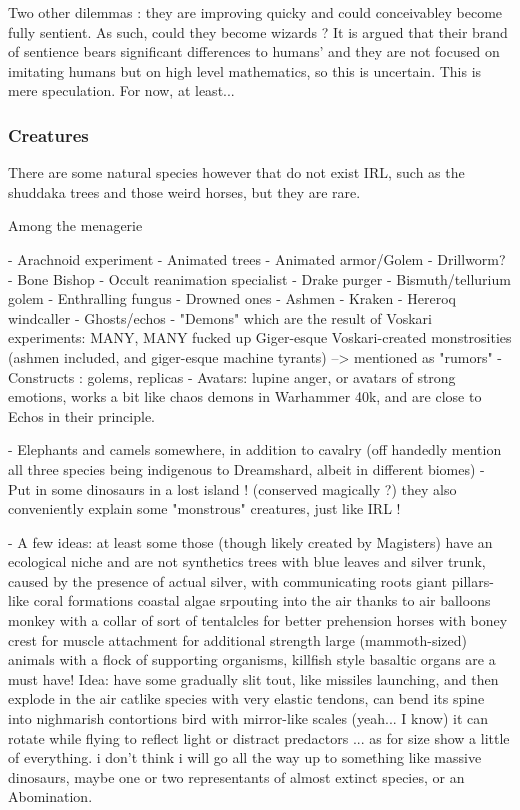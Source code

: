 Two other dilemmas : they are improving quicky and could conceivabley become fully sentient. As such, could they become wizards ? It is argued that their brand of sentience bears significant differences to humans' and they are not focused on imitating humans but on high level mathematics, so this is uncertain. This is mere speculation. For now, at least...







\subsubsection{Creatures}


There are some natural species however that do not exist IRL, such as the shuddaka trees and those weird horses, but they are rare.




Among the menagerie


- Arachnoid experiment
- Animated trees
- Animated armor/Golem
- Drillworm?
- Bone Bishop
- Occult reanimation specialist
- Drake purger
- Bismuth/tellurium golem
- Enthralling fungus
- Drowned ones
- Ashmen
- Kraken
- Hereroq windcaller
- Ghosts/echos
- "Demons" which are the result of Voskari experiments:	MANY, MANY fucked up Giger-esque Voskari-created monstrosities (ashmen included, and giger-esque machine tyrants) –> mentioned as "rumors"
- Constructs : golems, replicas
- Avatars: lupine anger, or avatars of strong emotions, works a bit like chaos demons in Warhammer 40k, and are close to Echos in their principle.





- Elephants and camels somewhere, in addition to cavalry (off handedly mention all three species being indigenous to Dreamshard, albeit in different biomes)
- Put in some dinosaurs in a lost island ! (conserved magically ?) they also conveniently explain some "monstrous" creatures, just like IRL !

- A few ideas: at least some those (though likely created by Magisters) have an ecological niche and are not synthetics
	trees with blue leaves and silver trunk, caused by the presence of actual silver, with communicating roots
	giant pillars-like coral formations
	coastal algae srpouting into the air thanks to air balloons
	monkey with a collar of sort of tentalcles for better prehension
	horses with boney crest for muscle attachment for additional strength
	large (mammoth-sized) animals with a flock of supporting organisms, killfish style
	basaltic organs are a must have! Idea: have some gradually slit tout, like missiles launching, and then explode in the air
	catlike species with very elastic tendons, can bend its spine into nighmarish contortions
	bird with mirror-like scales (yeah... I know) it can rotate while flying to reflect light or distract predactors
... as for size show a little of everything. i don't think i will go all the way up to something like massive dinosaurs, maybe one or two representants of almost extinct species, or an Abomination.



